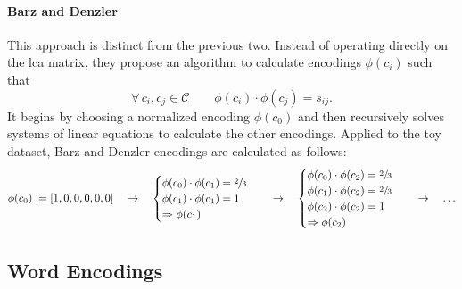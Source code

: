 \paragraph{Barz and Denzler~\cite{HierarchyBasedBarz2018}}\label{par:encoding-bd} This approach is distinct from the previous two. Instead of operating directly on the \acrshort{lca} matrix, they propose an algorithm to calculate encodings $\phi(c_i)$ such that
\begin{equation}
  \forall \, c_i, c_j \in \mathcal{C} \qquad
  \phi(c_i) \cdot \phi(c_j) = s_{ij}.
  \label{eq:bd-hierarchical-encoding}
\end{equation}
It begins by choosing a normalized encoding $\phi(c_0)$ and then recursively solves systems of linear equations to calculate the other encodings.
Applied to the toy dataset, Barz and Denzler encodings are calculated as follows:
\begin{equation*}
  \phi{\left(c_0\right)} := \left[1, 0, 0, 0, 0, 0\right]
  \quad \rightarrow \quad
  \begin{cases}
    \phi{\left(c_0\right)} \cdot \phi{\left(c_1\right)} = \sfrac{2}{3} \\
    \phi{\left(c_1\right)} \cdot \phi{\left(c_1\right)} = 1 \\
    \Rightarrow  \phi{\left(c_1\right)}
  \end{cases}
  \quad \rightarrow \quad
  \begin{cases}
    \phi{\left(c_0\right)} \cdot \phi{\left(c_2\right)} = \sfrac{2}{3} \\
    \phi{\left(c_1\right)} \cdot \phi{\left(c_2\right)} = \sfrac{2}{3} \\
    \phi{\left(c_2\right)} \cdot \phi{\left(c_2\right)} = 1 \\
    \Rightarrow \phi{\left(c_2\right)}
  \end{cases}
  \quad \rightarrow \quad \ldots
\end{equation*}

\subsection{Word Encodings}
\label{subsec:word-encoding}

